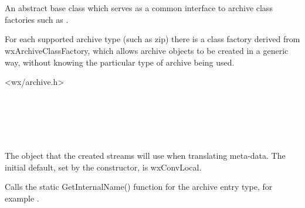 %
%

\section{}\label{wxarchiveclassfactory}

An abstract base class which serves as a common interface to
archive class factories such as .

For each supported archive type (such as zip) there is a class factory
derived from wxArchiveClassFactory, which allows archive objects to be
created in a generic way, without knowing the particular type of archive
being used.




<wx/archive.h>


\\
\\
\\
\\



\label{wxarchiveclassfactoryconv}



The  object that the created streams
will use when translating meta-data. The initial default, set by the
constructor, is wxConvLocal.


\label{wxarchiveclassfactorygetinternalname}


Calls the static GetInternalName() function for the archive entry type,
for example
 .


